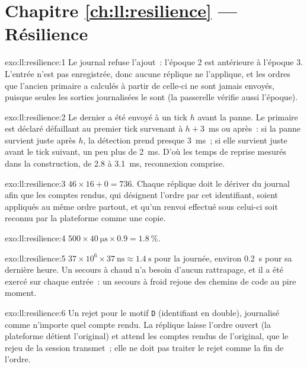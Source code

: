 \section*{Chapitre \ref{ch:ll:resilience} --- Résilience}

\begin{solution}{exo:ll:resilience:1}
Le journal refuse l'ajout~: l'époque 2 est antérieure à l'époque 3. L'entrée n'est pas enregistrée, donc aucune réplique ne l'applique, et les ordres
que l'ancien primaire a calculés à partir de celle-ci ne sont jamais envoyés, puisque seules les sorties journalisées le sont (la passerelle vérifie aussi l'époque).
\end{solution}

\begin{solution}{exo:ll:resilience:2}
Le dernier  a été envoyé à un tick $h$ avant la panne. Le primaire est déclaré défaillant au premier tick survenant à $h + 3$~ms ou après~: si
la panne survient juste après $h$, la détection prend presque \qty{3}{\milli\second}~; si elle survient juste avant le tick suivant, un peu
plus de \qty{2}{\milli\second}. D'où les temps de reprise mesurés dans la construction, de 2.8 à \qty{3.1}{\milli\second}, reconnexion comprise.
\end{solution}

\begin{solution}{exo:ll:resilience:3}
$46 \times 16 + 0 = 736$. Chaque réplique doit le dériver du journal afin que les comptes rendus, qui désignent l'ordre par cet
identifiant, soient appliqués au même ordre partout, et qu'un renvoi effectué sous celui-ci soit reconnu par la plateforme comme une copie.
\end{solution}

\begin{solution}{exo:ll:resilience:4}
$500 \times \qty{40}{\micro\second} \times 0.9 = 1.8~\%$.
\end{solution}

\begin{solution}{exo:ll:resilience:5}
$37 \times 10^6 \times \qty{37}{\nano\second} \approx \qty{1.4}{\second}$ pour la journée, environ \qty{0.2}{\second} pour sa dernière
heure. Un secours à chaud n'a besoin d'aucun rattrapage, et il a été exercé sur chaque entrée~: un secours à froid rejoue des chemins de code
au pire moment.
\end{solution}

\begin{solution}{exo:ll:resilience:6}
Un rejet pour le motif \texttt{D} (identifiant en double), journalisé comme n'importe quel compte rendu. La réplique laisse l'ordre ouvert (la
plateforme détient l'original) et attend les comptes rendus de l'original, que le rejeu de la session transmet~; elle ne doit pas traiter le
rejet comme la fin de l'ordre.
\end{solution}

